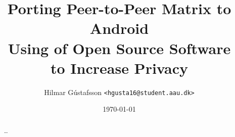 \documentclass[11pt,draft,notitlepage]{report}
\title{%
	Porting Peer-to-Peer Matrix to Android\\
	\large{%
		Using of Open Source Software\\
		to Increase Privacy
	}
}
\author{Hilmar Gústafsson \texttt{<hgusta16@student.aau.dk>}}
\date{\small\today} 			%
\begin{document}
\sloppy							%
\maketitle
\begin{abstract}
	\ldots
\end{abstract}
\setcounter{tocdepth}{1}
\tableofcontents
{}










\end{document}
